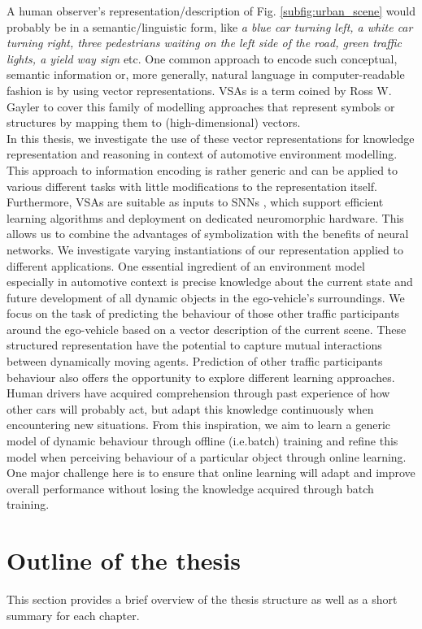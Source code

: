 A human observer's representation/description of Fig. \ref{subfig:urban_scene} would probably be in a semantic/linguistic form, like \emph{a blue car turning left, a white car turning right, three pedestrians waiting on the left side of the road, green traffic lights, a yield way sign} etc.
One common approach to encode such conceptual, semantic information or, more generally, natural language in computer-readable fashion is by using vector representations.
\acfp{VSA} is a term coined by Ross W. Gayler \cite{Gayler2003} to cover this family of modelling approaches that represent symbols or structures by mapping them to (high-dimensional) vectors.\\
In this thesis, we investigate the use of these vector representations for knowledge representation and reasoning in context of automotive environment modelling.
This approach to information encoding is rather generic and can be applied to various different tasks with little modifications to the representation itself. 
Furthermore, \acp{VSA} are suitable as inputs to \acp{SNN} \cite{Eliasmith2013}, which support efficient learning algorithms and deployment on dedicated neuromorphic hardware. 
This allows us to combine the advantages of symbolization with the benefits of neural networks.
We investigate varying instantiations of our representation applied to different applications. 
One essential ingredient of an environment model especially in automotive context is precise knowledge about the current state and future development of all dynamic objects in the ego-vehicle's surroundings.
We focus on the task of predicting the behaviour of those other traffic participants around the ego-vehicle based on a vector description of the current scene.
These structured representation have the potential to capture mutual interactions between dynamically moving agents.
Prediction of other traffic participants behaviour also offers the opportunity to explore different learning approaches.
Human drivers have acquired comprehension through past experience of how other cars will probably act, but adapt this knowledge continuously when encountering new situations.
From this inspiration, we aim to learn a generic model of dynamic behaviour through offline (i.e.batch) training and refine this model when perceiving behaviour of a particular object through online learning.
One major challenge here is to ensure that online learning will adapt and improve overall performance without losing the knowledge acquired through batch training.

\section{Outline of the thesis}
This section provides a brief overview of the thesis structure as well as a short summary for each chapter.